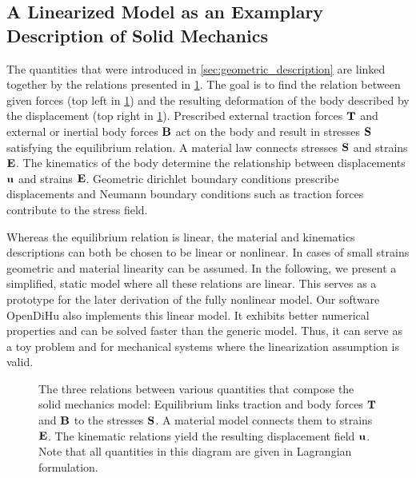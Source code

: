 \subsection{A Linearized Model as an Examplary Description of Solid Mechanics}

The quantities that were introduced in \cref{sec:geometric_description} are linked together by the relations presented in \cref{fig:tonti_diagram}. The goal is to find the relation between given forces (top left in \cref{fig:tonti_diagram}) and the resulting deformation of the body described by the displacement (top right in \cref{fig:tonti_diagram}).
Prescribed external traction forces $\textbf{T}$ and external or inertial body forces $\textbf{B}$ act on the body and result in stresses $\textbf{S}$ satisfying the equilibrium relation. A material law connects stresses $\textbf{S}$ and strains $\textbf{E}$. The kinematics of the body determine the relationship between displacements $\textbf{u}$ and strains $\textbf{E}$. Geometric dirichlet boundary conditions prescribe displacements and Neumann boundary conditions such as traction forces contribute to the stress field. 

Whereas the equilibrium relation is linear, the material and kinematics descriptions can both be chosen to be linear or nonlinear. 
In cases of small strains geometric and material linearity can be assumed.
In the following, we present a simplified, static model where all these relations are linear. 
This serves as a prototype for the later derivation of the fully nonlinear model. Our software OpenDiHu also implements this linear model. It exhibits better numerical properties and can be solved faster than the generic model. Thus, it can serve as a toy problem and for mechanical systems where the linearization assumption is valid.

\begin{figure}
  \centering%
  \def\svgwidth{\textwidth}
  \caption{The three relations between various quantities that compose the solid mechanics model: Equilibrium links traction and body forces $\textbf{T}$ and $\textbf{B}$ to the stresses $\textbf{S}$. A material model connects them to strains $\textbf{E}$. The kinematic relations yield the resulting displacement field $\textbf{u}$. Note that all quantities in this diagram are given in Lagrangian formulation.}%
  \label{fig:tonti_diagram}%
\end{figure}

